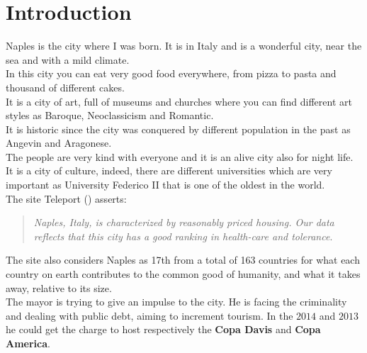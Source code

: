 \documentclass[a4paper, 12pt, oneside]{book}
\begin{document}
\setcounter{page}{1}
\tableofcontents %


\chapter*{Introduction}
\setcounter{page}{1}

\label{ch:Introduction}
Naples is the city where I was born. It is in Italy and is a wonderful city, near the sea and with a mild climate.\\ 

In this city you can eat very good food everywhere, from pizza to pasta and thousand of different cakes.\\ 

It is a city of art, full of museums and churches where you can find different art styles as Baroque, Neoclassicism and Romantic.\\

It is historic since the city was conquered by different population in the past as Angevin and Aragonese.\\ 

The people are very kind with everyone and it is an alive city also for night life.\\

It is a city of culture, indeed, there are different universities which are very important as University Federico II that is one of the oldest in the world.\\

The site Teleport (\cite{Teleport}) asserts:
\begin{quote}
\textit{Naples, Italy, is characterized by reasonably priced housing. Our data reflects that this city has a good ranking in health-care and tolerance}.
\end{quote}
The site also considers Naples as 17th from a total of 163 countries for what each country on earth contributes to the common good of humanity, and what it takes away, relative to its size.\\

The mayor is trying to give an impulse to the city. He is facing the criminality and dealing with public debt, aiming to increment tourism. In the $2014$ and $2013$ he could get the charge to host respectively the \textbf{Copa Davis} and \textbf{Copa America}.\\
\end{document}
